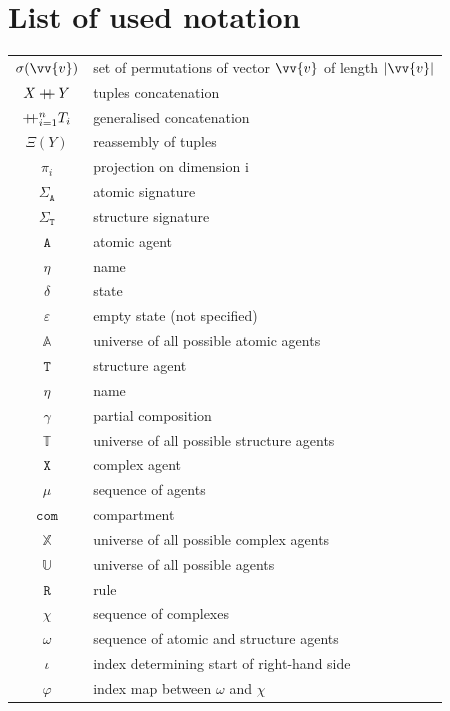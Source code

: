 \documentclass[12pt]{fithesis2}
\newcommand\mdoubleplus{\mathbin{+\mkern-7mu+}}
\begin{document}

{\small

}

\appendix

\chapter{List of used notation}

\begin{center}
\begin{tabular}{c | l}
$\sigma(\vv{v})$ & set of permutations of vector $\vv{v}$ of length $|\vv{v}|$\\
$X \mdoubleplus Y$ & tuples concatenation\\
$\mdoubleplus_{i=1}^n T_i$ & generalised concatenation\\
$\Xi(Y)$ & reassembly of tuples\\
$\pi_i$ & projection on dimension i\\
\hline 
$\Sigma_{\mathtt{A}}$ & atomic signature \\
$\Sigma_{\mathtt{T}}$ & structure signature \\
\hline 
$\mathtt{A}$ & atomic agent \\
$\eta$ & name \\
$\delta$ & state \\
$\varepsilon$ & empty state (not specified)\\
$\mathds{A}$ & universe of all possible atomic agents \\
\hline 
$\mathtt{T}$ & structure agent \\
$\eta$ & name \\
$\gamma$ & partial composition\\
$\mathds{T}$ & universe of all possible structure agents\\
\hline 
$\mathtt{X}$ & complex agent\\
$\mu$ & sequence of agents\\
$\mathtt{com}$ & compartment\\
$\mathds{X}$ & universe of all possible complex agents\\
$\mathds{U}$ & universe of all possible agents\\
\hline 
$\mathtt{R}$ & rule\\
$\chi$ & sequence of complexes\\
$\omega$ & sequence of atomic and structure agents\\
$\iota$ & index determining start of right-hand side\\
$\varphi$ & index map between $\omega$ and $\chi$\\

\end{tabular}
\end{center}
\end{document}
